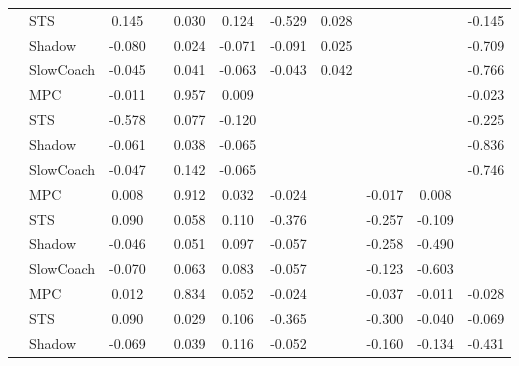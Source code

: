 \begin{tabular}{|l|l|*{9}{c|}}
                                                           & STS &    0.145 &        &     0.030 &  0.124 & -0.529 &  0.028 &      &      &   -0.145 \\
                                                           & Shadow &   -0.080 &        &     0.024 & -0.071 & -0.091 &  0.025 &      &      &   -0.709 \\
                                                           & SlowCoach &   -0.045 &        &     0.041 & -0.063 & -0.043 &  0.042 &      &      &   -0.766 \\
\midrule
[True, False, True, True, False, False, False, False, True] & MPC &   -0.011 &        &     0.957 &  0.009 &     &     &      &      &   -0.023 \\
                                                           & STS &   -0.578 &        &     0.077 & -0.120 &     &     &      &      &   -0.225 \\
                                                           & Shadow &   -0.061 &        &     0.038 & -0.065 &     &     &      &      &   -0.836 \\
                                                           & SlowCoach &   -0.047 &        &     0.142 & -0.065 &     &     &      &      &   -0.746 \\
\midrule
[True, False, True, True, True, False, True, True, False] & MPC &    0.008 &        &     0.912 &  0.032 & -0.024 &     &  -0.017 &   0.008 &       \\
                                                           & STS &    0.090 &        &     0.058 &  0.110 & -0.376 &     &  -0.257 &  -0.109 &       \\
                                                           & Shadow &   -0.046 &        &     0.051 &  0.097 & -0.057 &     &  -0.258 &  -0.490 &       \\
                                                           & SlowCoach &   -0.070 &        &     0.063 &  0.083 & -0.057 &     &  -0.123 &  -0.603 &       \\
\midrule
[True, False, True, True, True, False, True, True, True] & MPC &    0.012 &        &     0.834 &  0.052 & -0.024 &     &  -0.037 &  -0.011 &   -0.028 \\
                                                           & STS &    0.090 &        &     0.029 &  0.106 & -0.365 &     &  -0.300 &  -0.040 &   -0.069 \\
                                                           & Shadow &   -0.069 &        &     0.039 &  0.116 & -0.052 &     &  -0.160 &  -0.134 &   -0.431 \\

\end{tabular}

